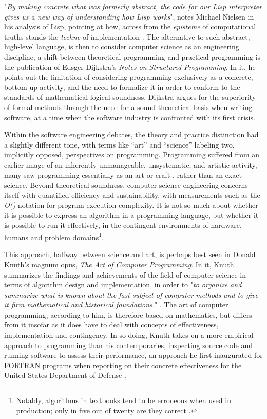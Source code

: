 "\emph{By making concrete what was formerly abstract, the code for our Lisp interpreter gives us a new way of understanding how Lisp works}", notes Michael Nielsen in his analysis of Lisp, pointing at how, across from the \emph{episteme} of computational truths stands the \emph{techne} of implementation \citep{nielsen_lisp_2012}. The alternative to such abstract, high-level language, is then to consider computer science as an engineering discipline, a shift between theoretical programming and practical programming is the publication of Edsger Dijkstra's \emph{Notes on Structured Programming}. In it, he points out the limitation of considering programming exclusively as a concrete, bottom-up activity, and the need to formalize it in order to conform to the standards of mathematical logical soundness. Dijkstra argues for the superiority of formal methods through the need for a sound theoretical basis when writing software, at a time when the software industry is confronted with its first crisis.

Within the software engineering debates, the theory and practice distinction had a slightly different tone, with terms like “art” and “science” labeling two, implicitly opposed, perspectives on programming. Programming suffered from an earlier image of an inherently unmanageable, unsystematic, and artistic activity, many saw programming essentially as an art or craft \citep{tedre_development_2006}, rather than an exact science. Beyond theoretical soundness, computer science engineering concerns itself with quantified efficiency and sustainability, with measurements such as the \emph{O()} notation for program execution complexity. It is not so much about whether it is possible to express an algorithm in a programming language, but whether it is possible to run it effectively, in the contingent environments of hardware, humans and problem domains\footnote{Notably, algorithms in textbooks tend to be erroneous when used in production; only in five out of twenty are they correct \citep{pattis_textbook_1988}.}.

This approach, halfway between science and art, is perhaps best seen in Donald Knuth's magnum opus, \emph{The Art of Computer Programming}. In it, Knuth summarizes the findings and achievements of the field of computer science in terms of algorithm design and implementation, in order to "\emph{to organize and summarize what is known about the fast subject of computer methods and to give it firm mathematical and historical foundations.}" \citep{knuth_art_1997}. The art of computer programming, according to him, is therefore based on mathematics, but differs from it insofar as it does have to deal with concepts of effectiveness, implementation and contingency. In so doing, Knuth takes on a more empirical approach to programming than his contemporaries, inspecting source code and running software to assess their performance, an approach he first inaugurated for FORTRAN programs when reporting on their concrete effectiveness for the United States Department of Defense \citep{defensetechnicalinformationcenter_empirical_1970}.


